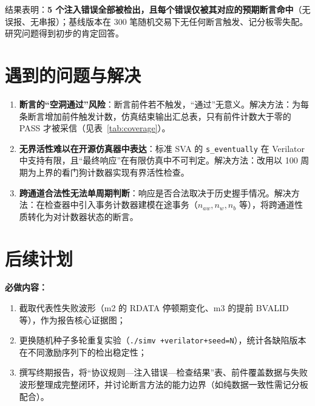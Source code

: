 \documentclass[12pt, a4paper, oneside]{ctexart}
\begin{document}
结果表明：\textbf{5 个注入错误全部被检出，且每个错误仅被其对应的预期断言命中}（无误报、无串报）；基线版本在 300 笔随机交易下无任何断言触发、记分板零失配。研究问题得到初步的肯定回答。


\section{遇到的问题与解决}

\begin{enumerate}
  \item \textbf{断言的``空洞通过''风险}：断言前件若不触发，``通过''无意义。解决方法：为每条断言增加前件触发计数，仿真结束输出汇总表，只有前件计数大于零的 PASS 才被采信（见表~\ref{tab:coverage}）。
  \item \textbf{无界活性难以在开源仿真器中表达}：标准 SVA 的 \texttt{s\_eventually} 在 Verilator 中支持有限，且``最终响应''在有限仿真中不可判定。解决方法：改用以 100 周期为上界的看门狗计数器实现有界活性检查。
  \item \textbf{跨通道合法性无法单周期判断}：响应是否合法取决于历史握手情况。解决方法：在检查器中引入事务计数器建模在途事务（$n_{aw}, n_w, n_b$ 等），将跨通道性质转化为对计数器状态的断言。
\end{enumerate}

\section{后续计划}

\textbf{必做内容：}
\begin{enumerate}
  \item 截取代表性失败波形（m2 的 RDATA 停顿期变化、m3 的提前 BVALID 等），作为报告核心证据图；
  \item 更换随机种子多轮重复实验（\texttt{./simv +verilator+seed=N}），统计各缺陷版本在不同激励序列下的检出稳定性；
  \item 撰写终期报告，将``协议规则---注入错误---检查结果''表、前件覆盖数据与失败波形整理成完整闭环，并讨论断言方法的能力边界（如纯数据一致性需记分板配合）。
\end{enumerate}
\end{document}
